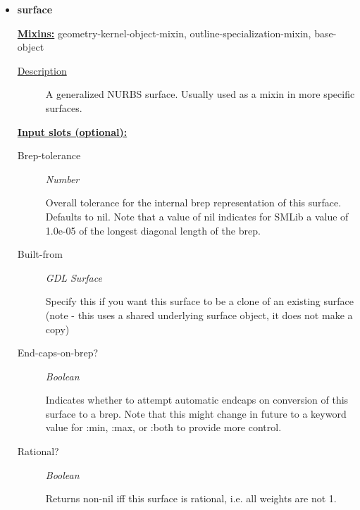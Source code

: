 \documentclass [11pt]{book}
\begin{document}
\begin{itemize}
\item {}
\label{prim:surface}
\textbf{surface}


\textbf{
\underline{Mixins:}} geometry-kernel-object-mixin, outline-specialization-mixin, base-object





\begin{description}

\item [
\underline{Description}]


A generalized NURBS surface. 
Usually used as a mixin in more specific surfaces.



\end{description}








\textbf{
\underline{Input slots (optional):}}

\begin{description}

\item [Brep-tolerance]
\emph{Number}

 Overall tolerance for the internal brep representation of this surface.
Defaults to nil. Note that a value of nil indicates for SMLib a value of 1.0e-05 of
the longest diagonal length of the brep.




\item [Built-from]
\emph{GDL Surface}

 Specify this if you want this surface to be a
clone of an existing surface (note - this uses a shared underlying
surface object, it does not make a copy)




\item [End-caps-on-brep?]
\emph{Boolean}

 Indicates whether to attempt automatic endcaps on conversion
of this surface to a brep.
Note that this might change in future to a keyword value
for :min, :max, or :both to provide more control.




\item [Rational?]
\emph{Boolean}

 Returns non-nil iff this surface is rational, i.e. all weights are not 1.





\end{description}
\end{itemize}
\end{document}
